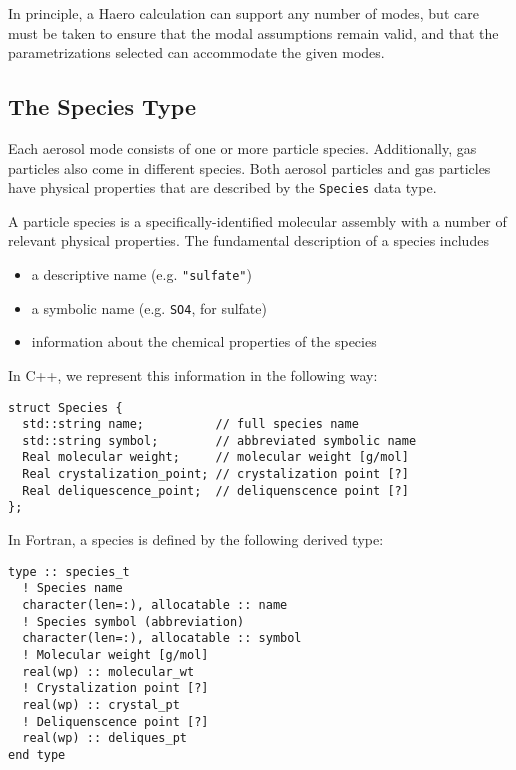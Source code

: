 In principle, a Haero calculation can support any number of modes, but care
must be taken to ensure that the modal assumptions remain valid, and that
the parametrizations selected can accommodate the given modes.

\subsection{The Species Type}

Each aerosol mode consists of one or more particle species. Additionally,
gas particles also come in different species. Both aerosol particles and
gas particles have physical properties that are described by the
\texttt{Species} data type.

A particle species is a specifically-identified molecular assembly with
a number of relevant physical properties. The fundamental description of a
species includes

\begin{itemize}
  \item a descriptive name (e.g. \texttt{"sulfate"})
  \item a symbolic name (e.g. \texttt{SO4}, for sulfate)
  \item information about the chemical properties of the species
\end{itemize}

In C++, we represent this information in the following way:

\begin{lstlisting}
struct Species {
  std::string name;          // full species name
  std::string symbol;        // abbreviated symbolic name
  Real molecular weight;     // molecular weight [g/mol]
  Real crystalization_point; // crystalization point [?]
  Real deliquescence_point;  // deliquenscence point [?]
};
\end{lstlisting}

In Fortran, a species is defined by the following derived type:
\begin{lstlisting}
type :: species_t
  ! Species name
  character(len=:), allocatable :: name
  ! Species symbol (abbreviation)
  character(len=:), allocatable :: symbol
  ! Molecular weight [g/mol]
  real(wp) :: molecular_wt
  ! Crystalization point [?]
  real(wp) :: crystal_pt
  ! Deliquenscence point [?]
  real(wp) :: deliques_pt
end type
\end{lstlisting}

